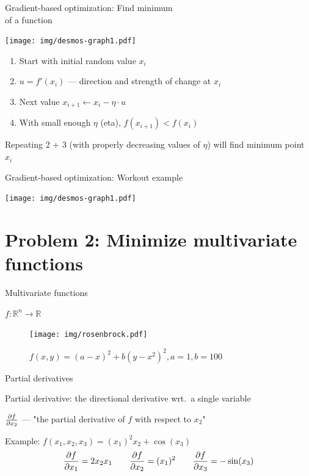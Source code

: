 \documentclass[12pt,aspectratio=169,handout]{beamer}
\begin{document}
\begin{frame}{Gradient-based optimization: Find minimum\\ of a function}
	
	\texttt{[image: img/desmos-graph1.pdf]}
	
	
	\begin{enumerate}
		\item Start with initial random value $x_i$
		\item $u = f'(x_i)$ --- direction and strength of change at $x_i$
		\item Next value $x_{i + 1} \gets x_i - \eta \cdot u$
		\item With small enough $\eta$ (eta), $f(x_{i+1}) < f(x_i)$
	\end{enumerate}
	Repeating 2 + 3 (with properly decreasing values of $\eta$) will find minimum point $x_i$
	
	
	
\end{frame}


\begin{frame}{Gradient-based optimization: Workout example}
	
	\texttt{[image: img/desmos-graph1.pdf]}
	
	
\end{frame}


\section{Problem 2: Minimize multivariate functions}


\begin{frame}{Multivariate functions}
	
	$f: \mathbb{R}^n \to \mathbb{R}$
	
	\pause
	
	\begin{figure}
		\centering
		\texttt{[image: img/rosenbrock.pdf]}
		\caption{$f(x,y)=(a-x)^{2}+b(y-x^{2})^{2}, a = 1, b = 100$}
	\end{figure}
\end{frame}




\begin{frame}{Partial derivatives}
	
	Partial derivative: the directional derivative wrt.\ a single variable
	
	\bigskip
	
	$\pdv{f}{x_2}$ --- "the partial derivative of $f$ with respect to $x_2$"
	
	\bigskip
	
	\begin{block}{Example: $f(x_1, x_2, x_3) = (x_1)^2 x_2 + \cos(x_3)$}
		$$
		\pdv{f}{x_1} = 2 x_2 x_1 \qquad \pdv{f}{x_2} = (x_1)^2 \qquad \pdv{f}{x_3} = - \sin (x_3)
		$$
	\end{block}
	
	
\end{frame}
\end{document}
